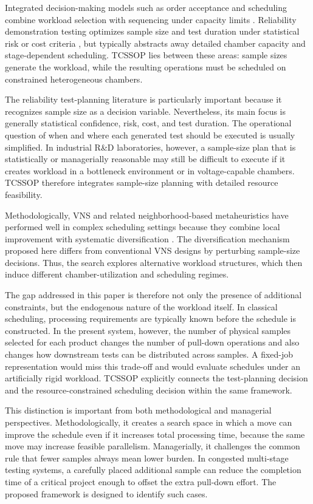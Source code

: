 \documentclass[11pt]{article}
\begin{document}
Integrated decision-making models such as order acceptance and scheduling combine workload selection with sequencing under capacity limits \citep{Slotnick2011,WangYe2019}. Reliability demonstration testing optimizes sample size and test duration under statistical risk or cost criteria \citep{Fernandez2022}, but typically abstracts away detailed chamber capacity and stage-dependent scheduling. TCSSOP lies between these areas: sample sizes generate the workload, while the resulting operations must be scheduled on constrained heterogeneous chambers.

The reliability test-planning literature is particularly important because it recognizes sample size as a decision variable. Nevertheless, its main focus is generally statistical confidence, risk, cost, and test duration. The operational question of when and where each generated test should be executed is usually simplified. In industrial R\&D laboratories, however, a sample-size plan that is statistically or managerially reasonable may still be difficult to execute if it creates workload in a bottleneck environment or in voltage-capable chambers. TCSSOP therefore integrates sample-size planning with detailed resource feasibility.

Methodologically, VNS and related neighborhood-based metaheuristics have performed well in complex scheduling settings because they combine local improvement with systematic diversification \citep{MejiaYuraszeck2020}. The diversification mechanism proposed here differs from conventional VNS designs by perturbing sample-size decisions. Thus, the search explores alternative workload structures, which then induce different chamber-utilization and scheduling regimes.

The gap addressed in this paper is therefore not only the presence of additional constraints, but the endogenous nature of the workload itself. In classical scheduling, processing requirements are typically known before the schedule is constructed. In the present system, however, the number of physical samples selected for each product changes the number of pull-down operations and also changes how downstream tests can be distributed across samples. A fixed-job representation would miss this trade-off and would evaluate schedules under an artificially rigid workload. TCSSOP explicitly connects the test-planning decision and the resource-constrained scheduling decision within the same framework.

This distinction is important from both methodological and managerial perspectives. Methodologically, it creates a search space in which a move can improve the schedule even if it increases total processing time, because the same move may increase feasible parallelism. Managerially, it challenges the common rule that fewer samples always mean lower burden. In congested multi-stage testing systems, a carefully placed additional sample can reduce the completion time of a critical project enough to offset the extra pull-down effort. The proposed framework is designed to identify such cases.
\end{document}
